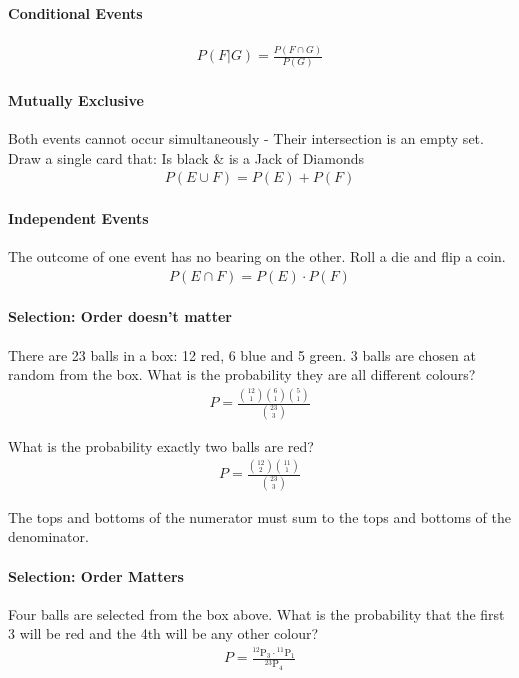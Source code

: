 \documentclass[11pt]{article}
\newcommand{\Perm}[2] { {}^{#1} \text{P}_{#2} }
\begin{document}
    \paragraph{Conditional Events}
    \begin{align}
        P\left(F|G\right) = \frac{P\left(F \cap G\right) } { P\left(G\right) }
    \end{align}

    \paragraph{Mutually Exclusive}
    Both events cannot occur simultaneously - Their intersection is an empty set. \\
    Draw a single card that: Is black \& is a Jack of Diamonds
    \begin{align}
        P\left(E \cup F\right) = P\left(E\right) + P\left(F\right)
    \end{align}

    \paragraph{Independent Events}
    The outcome of one event has no bearing on the other.
    Roll a die and flip a coin.
    \begin{align}
        P\left(E \cap F\right) = P\left(E\right) \cdot P\left(F\right)
    \end{align}

    \paragraph{Selection: Order doesn't matter}
    There are 23 balls in a box: 12 red, 6 blue and 5 green.
    3 balls are chosen at random from the box.
    What is the probability they are all different colours?
    \begin{align}
        P = \frac{ \binom{12}{1} \binom{6}{1} \binom{5}{1} } {\binom{23}{3}}
    \end{align}

    What is the probability exactly two balls are red?
    \begin{align}
        P = \frac{ \binom{12}{2} \binom{11}{1} } {\binom{23}{3}}
    \end{align}

    The tops and bottoms of the numerator must sum to the tops and bottoms
    of the denominator.

    \paragraph{Selection: Order Matters}
    Four balls are selected from the box above.
    What is the probability that the first 3 will be red
    and the 4th will be any other colour?
    \begin{align}
        P = \frac { \Perm{12}{3} \cdot \Perm{11}{1} } {\Perm{23}{4}}
    \end{align}
\end{document}
